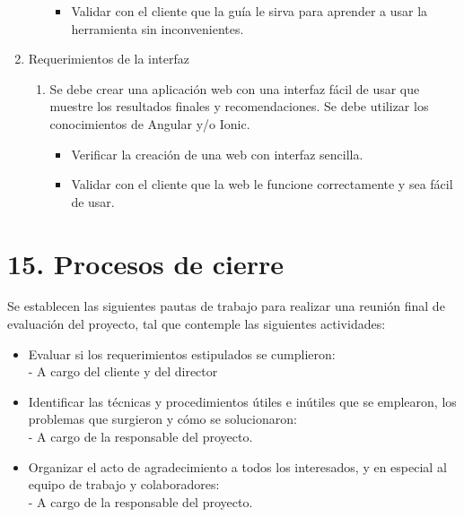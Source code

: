 \documentclass[
11pt, %
codirector, %
]{charter}
\begin{document}
\begin{enumerate}
\begin{enumerate}
\begin{itemize}
                    	\item Validar con el cliente que la guía le sirva para aprender a usar la herramienta sin inconvenientes.
                    \end{itemize}
		\end{enumerate}
	\item Requerimientos de la interfaz
 		\begin{enumerate}
			\item Se debe crear una aplicación web con una interfaz fácil de usar que muestre los resultados finales y recomendaciones. Se debe utilizar los conocimientos de Angular y/o Ionic.
                 \begin{itemize}
                    	\item Verificar la creación de una web con interfaz sencilla.
                    	\item Validar con el cliente que la web le funcione correctamente y sea fácil de usar.
                    \end{itemize}
		\end{enumerate}

\end{enumerate}

\section{15. Procesos de cierre}    
\label{sec:cierre}


Se establecen las siguientes pautas de trabajo para realizar una reunión final de evaluación del proyecto, tal que contemple las siguientes actividades:

\begin{itemize}
	\item Evaluar si los requerimientos estipulados se cumplieron:\\
	 - A cargo del cliente y del director
	\item Identificar las técnicas y procedimientos útiles e inútiles que se emplearon, los problemas que surgieron y cómo se solucionaron:\\
	 - A cargo de la responsable del proyecto.
	\item Organizar el acto de agradecimiento a todos los interesados, y en especial al equipo de trabajo y colaboradores:\\
	  - A cargo de la responsable del proyecto.
\end{itemize}
\end{document}
